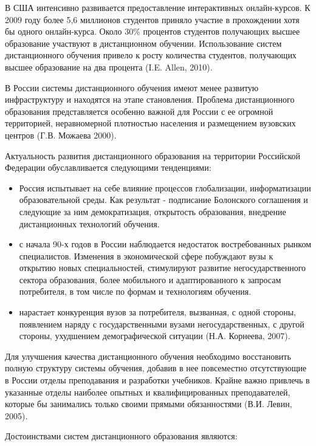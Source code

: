 В США интенсивно развивается предоставление интерактивных онлайн-курсов. К 2009 году более 5,6 миллионов студентов приняло участие в прохождении хотя бы одного онлайн-курса. Около 30\% процентов студентов получающих высшее образование участвуют в дистанционном обучении. Использование систем дистанционного обучения привело к росту количества студентов, получающих высшее образование на два процента (I.E. Allen, 2010).

В России системы дистанционного обучения имеют менее развитую инфраструктуру и находятся на этапе становления. Проблема дистанционного образования представляется особенно важной для России с ее огромной территорией, неравномерной плотностью населения и размещением вузовских центров (Г.В. Можаева 2000).

Актуальность развития дистанционного образования на территории Российской Федерации обуславливается следующими тенденциями:

\begin{itemize}
\item Россия испытывает на себе влияние процессов глобализации, информатизации образовательной среды. Как результат - подписание Болонского соглашения и следующие за ним демократизация, открытость образования, внедрение дистанционных технологий обучения.
\item с начала 90-х годов в России наблюдается недостаток востребованных рынком специалистов. Изменения в экономической сфере побуждают вузы к открытию новых специальностей, стимулируют развитие негосударственного сектора образования, более мобильного и адаптированного к запросам потребителя, в том числе по формам и технологиям обучения.
\item нарастает конкуренция вузов за потребителя, вызванная, с одной стороны, появлением наряду с государственными вузами негосударственных, с другой стороны, ухудшением демографической ситуации (Н.А. Корнеева, 2007).
\end{itemize}

Для улучшения качества дистанционного обучения необходимо восстановить полную структуру системы обучения, добавив в нее повсеместно отсутствующие в России отделы преподавания и разработки учебников. Крайне важно привлечь в указанные отделы наиболее опытных и квалифицированных преподавателей, которые бы занимались только своими прямыми обязанностями (В.И. Левин, 2005). 

Достоинствами систем дистанционного образования являются:

